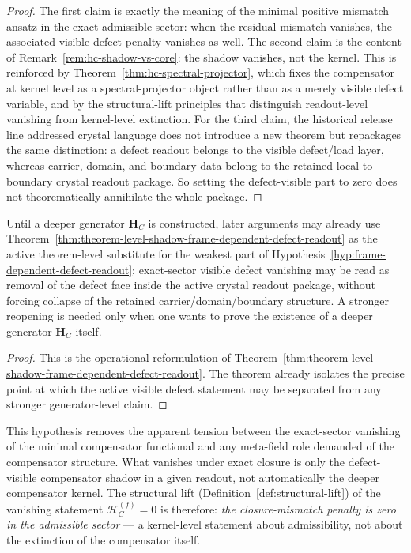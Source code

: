 \begin{proof}
The first claim is exactly the meaning of the minimal positive mismatch ansatz in the exact admissible sector: when the residual mismatch vanishes, the associated visible defect penalty vanishes as well. The second claim is the content of Remark~\ref{rem:hc-shadow-vs-core}: the shadow vanishes, not the kernel. This is reinforced by Theorem~\ref{thm:hc-spectral-projector}, which fixes the compensator at kernel level as a spectral-projector object rather than as a merely visible defect variable, and by the structural-lift principles that distinguish readout-level vanishing from kernel-level extinction. For the third claim, the historical release line addressed crystal language does not introduce a new theorem but repackages the same distinction: a defect readout belongs to the visible defect/load layer, whereas carrier, domain, and boundary data belong to the retained local-to-boundary crystal readout package. So setting the defect-visible part to zero does not theorematically annihilate the whole package.
\end{proof}

\begin{corollary}
\label{cor:operational-reading-hypothesis-75-crystal-language}
Until a deeper generator $\mathbf H_C$ is constructed, later arguments may already use Theorem~\ref{thm:theorem-level-shadow-frame-dependent-defect-readout} as the active theorem-level substitute for the weakest part of Hypothesis~\ref{hyp:frame-dependent-defect-readout}: exact-sector visible defect vanishing may be read as removal of the defect face inside the active crystal readout package, without forcing collapse of the retained carrier/domain/boundary structure. A stronger reopening is needed only when one wants to prove the existence of a deeper generator $\mathbf H_C$ itself.
\end{corollary}

\begin{proof}
This is the operational reformulation of Theorem~\ref{thm:theorem-level-shadow-frame-dependent-defect-readout}. The theorem already isolates the precise point at which the active visible defect statement may be separated from any stronger generator-level claim.
\end{proof}


\begin{remark}
This hypothesis removes the apparent tension between the exact-sector
vanishing of the minimal compensator functional and any meta-field role
demanded of the compensator structure. What vanishes under exact closure
is only the defect-visible compensator shadow in a given readout, not
automatically the deeper compensator kernel. The structural lift
(Definition~\ref{def:structural-lift}) of the vanishing statement
$\mathcal{H}_C^{(f)} = 0$ is therefore: \emph{the closure-mismatch
penalty is zero in the admissible sector} --- a kernel-level statement
about admissibility, not about the extinction of the compensator itself.
\end{remark}


